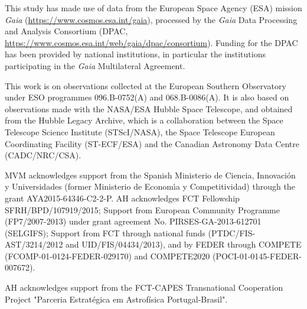 This study has made use of data from the European Space Agency (ESA) mission
{\it Gaia} (\url{https://www.cosmos.esa.int/gaia}), processed by the {\it Gaia}
Data Processing and Analysis Consortium (DPAC,
\url{https://www.cosmos.esa.int/web/gaia/dpac/consortium}). Funding for the DPAC
has been provided by national institutions, in particular the institutions
participating in the {\it Gaia} Multilateral Agreement.

This work is on observations collected at the European Southern Observatory under ESO programmes 096.B-0752(A) and 068.B-0086(A). It is also based on observations made with the NASA/ESA Hubble Space Telescope, and obtained from the Hubble Legacy Archive, which is a collaboration between the Space Telescope Science Institute (STScI/NASA), the Space Telescope European Coordinating Facility (ST-ECF/ESA) and the Canadian Astronomy Data Centre (CADC/NRC/CSA).

MVM acknowledges support from the Spanish Ministerio de Ciencia, Innovación y Universidades (former Ministerio de Econom\'\i a y Competitividad) through the grant AYA2015-64346-C2-2-P. AH acknowledges FCT Fellowship SFRH/BPD/107919/2015; Support from
European Community Programme (FP7/2007-2013) under grant agreement
No. PIRSES-GA-2013-612701 (SELGIFS); Support from FCT through national funds (PTDC/FIS-AST/3214/2012 and UID/FIS/04434/2013), and by FEDER through COMPETE (FCOMP-01-0124-FEDER-029170) and COMPETE2020 
(POCI-01-0145-FEDER-007672). 

AH acknowledges support from the FCT-CAPES Transnational Cooperation Project "Parceria
Estrat\'egica em Astrof\'{i}sica Portugal-Brasil".
